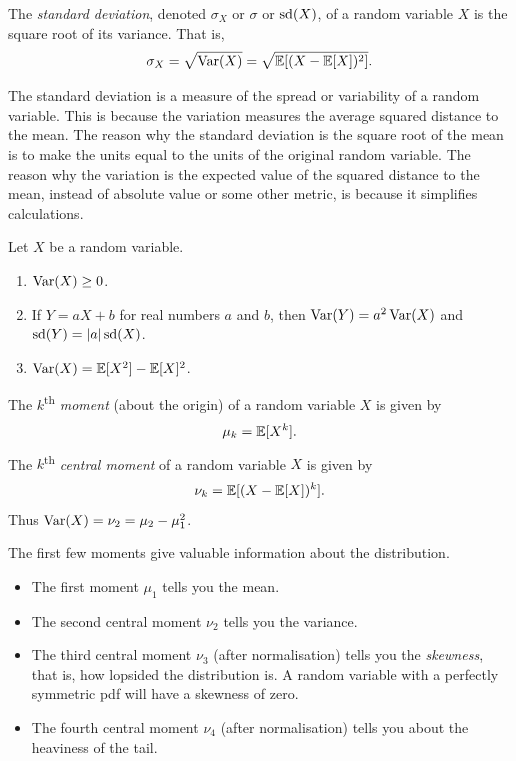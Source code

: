 \begin{definition}
  The \emph{standard deviation}, denoted $\sigma_X$ or $\sigma$ or $\operatorname{sd}(X)$, of a random variable $X$ is the square root of its variance. That is, \[
    \sigma_X = \sqrt{\operatorname{Var}(X)} = \sqrt{\operatorname{\mathbb{E}}[(X - \operatorname{\mathbb{E}}[X])^2]}.
  \] 
\end{definition}

\begin{remark}
  The standard deviation is a measure of the spread or variability of a random variable. This is because the variation measures the average squared distance to the mean. The reason why the standard deviation is the square root of the mean is to make the units equal to the units of the original random variable. The reason why the variation is the expected value of the squared distance to the mean, instead of absolute value or some other metric, is because it simplifies calculations.
\end{remark}

\begin{proposition}
  Let $X$ be a random variable.
  \begin{enumerate}
    \item $\operatorname{Var}(X) \ge 0$.
    \item If $Y = aX + b$ for real numbers $a$ and $b$, then $\operatorname{Var}(Y) = a^2\operatorname{Var}(X)$ and $\operatorname{sd}(Y) = \lvert a\rvert\operatorname{sd}(X)$.
    \item $\operatorname{Var}(X) = \operatorname{\mathbb{E}}[X^2] - \operatorname{\mathbb{E}}[X]^2$.
  \end{enumerate}
\end{proposition}

\begin{definition}
  The $k$\textsuperscript{th} \emph{moment} (about the origin) of a random variable $X$ is given by \[
    \mu_k = \operatorname{\mathbb{E}}[X^k].
  \] The $k$\textsuperscript{th} \emph{central moment} of a random variable $X$ is given by \[
  \nu_k = \operatorname{\mathbb{E}}[(X - \operatorname{\mathbb{E}}[X])^{k}].
  \] Thus $\operatorname{Var}(X) = \nu_2 = \mu_2 - \mu_1^2$.
\end{definition}

\begin{remark}
  The first few moments give valuable information about the distribution. 
  \begin{itemize}
    \item The first moment $\mu_1$ tells you the mean.
    \item The second central moment $\nu_2$ tells you the variance.
    \item The third central moment $\nu_3$ (after normalisation) tells you the \emph{skewness}, that is, how lopsided the distribution is. A random variable with a perfectly symmetric pdf will have a skewness of zero.
    \item The fourth central moment $\nu_4$ (after normalisation) tells you about the heaviness of the tail.
  \end{itemize}
\end{remark}

